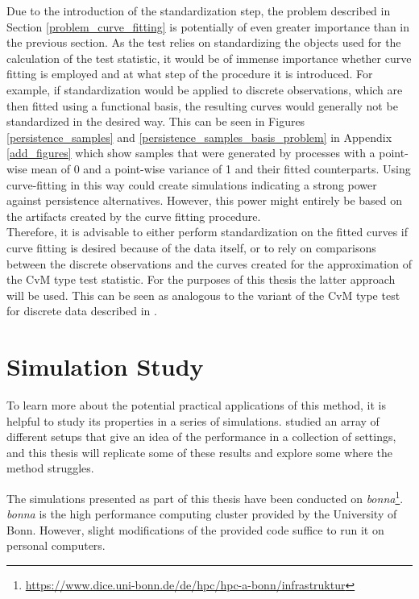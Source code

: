 \documentclass[12pt, a4paper]{article}
\theoremstyle{MAstyle} \newtheorem{assumption}{Assumption}[section]
\theoremstyle{MAstyle} \newtheorem{definition}{Definition}[section]
\theoremstyle{MAstyle} \newtheorem{theorem}{Theorem}[section]
\begin{document}
		Due to the introduction of the standardization step, the problem described in Section \ref{problem_curve_fitting} is potentially of even greater importance than in the previous section. As the test relies on standardizing the objects used for the calculation of the test statistic, it would be of immense importance whether curve fitting is employed and at what step of the procedure it is introduced. For example, if standardization would be applied to discrete observations, which are then fitted using a functional basis, the resulting curves would generally not be standardized in the desired way. This can be seen in Figures \ref{persistence_samples} and \ref{persistence_samples_basis_problem} in Appendix \ref{add_figures} which show samples that were generated by processes with a point-wise mean of 0 and a point-wise variance of 1 and their fitted counterparts. 
		Using curve-fitting in this way could create simulations indicating a strong power against persistence alternatives. However, this power might entirely be based on the artifacts created by the curve fitting procedure.\\
		Therefore, it is advisable to either perform standardization on the fitted curves if curve fitting is desired because of the data itself, or to rely on comparisons between the discrete observations and the curves created for the approximation of the CvM type test statistic. For the purposes of this thesis the latter approach will be used. This can be seen as analogous to the variant of the CvM type test for discrete data described in \cite{bugni_permutation_2021}.
		
	\section{Simulation Study}\label{Simulation_Study}
		To learn more about the potential practical applications of this method, it is helpful to study its properties in a series of simulations. \cite{bugni_permutation_2021} studied an array of different setups that give an idea of the performance in a collection of settings, and this thesis will replicate some of these results and explore some where the method struggles.
		
		The simulations presented as part of this thesis have been conducted on \textit{bonna}\footnote{\href{https://www.dice.uni-bonn.de/de/hpc/hpc-a-bonn/infrastruktur}{https://www.dice.uni-bonn.de/de/hpc/hpc-a-bonn/infrastruktur}}. \textit{bonna} is the high performance computing cluster provided by the University of Bonn. However, slight modifications of the provided code suffice to run it on personal computers.\\
\end{document}
